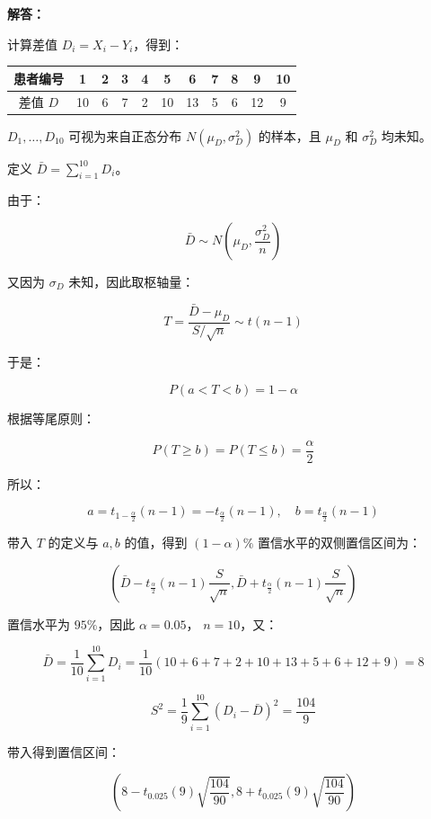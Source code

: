 \documentclass[12pt,a4paper]{article}
\begin{document}
\begin{answerbox}
\textbf{解答：}

计算差值 $D_i = X_i - Y_i$，得到：

\begin{center}
\begin{tabular}{ccccccccccc}
\toprule
患者编号 & 1 & 2 & 3 & 4 & 5 & 6 & 7 & 8 & 9 & 10 \\
\midrule
差值 $D$ & 10 & 6 & 7 & 2 & 10 & 13 & 5 & 6 & 12 & 9 \\
\bottomrule
\end{tabular}
\end{center}

$D_1, \ldots, D_{10}$ 可视为来自正态分布 $N(\mu_D, \sigma_D^2)$ 的样本，且 $\mu_D$ 和 $\sigma_D^2$ 均未知。

定义 $\bar{D} = \sum_{i=1}^{10}D_i$。

由于：

$$
\bar{D} \sim N\left(\mu_D, \frac{\sigma_D^2}{n}\right)
$$

又因为 $\sigma_D$ 未知，因此取枢轴量：

$$
T = \frac{\bar{D}-\mu_D}{S/\sqrt{n}} \sim t(n-1)
$$

于是：

$$
P\left(a < T < b\right) = 1 - \alpha
$$

根据等尾原则：

$$
P\left(T \geq b\right) = P\left(T \leq b\right) = \frac{\alpha}{2}
$$

所以：

$$
a = t_{1-\frac{\alpha}{2}}(n-1) = -t_{\frac{\alpha}{2}}(n-1), \quad b = t_{\frac{\alpha}{2}}(n-1)
$$

带入 $T$ 的定义与 $a,b$ 的值，得到 $(1-\alpha)\%$ 置信水平的双侧置信区间为：

$$
\left(\bar{D} - t_{\frac{\alpha}{2}}(n-1)\frac{S}{\sqrt{n}}, \bar{D} + t_{\frac{\alpha}{2}}(n-1)\frac{S}{\sqrt{n}}\right)
$$

置信水平为 $95\%$，因此 $\alpha = 0.05$， $n = 10$，又：

$$
\bar{D} = \frac{1}{10}\sum_{i=1}^{10}D_i = \frac{1}{10}(10+6+7+2+10+13+5+6+12+9) = 8
$$

$$
S^2 = \frac{1}{9}\sum_{i=1}^{10}(D_i - \bar{D})^2 = \frac{104}{9}
$$

带入得到置信区间：

$$
\left(8 - t_{0.025}(9)\sqrt{\frac{104}{90}}, 8 + t_{0.025}(9)\sqrt{\frac{104}{90}}\right)
$$


\end{answerbox}
\end{document}
